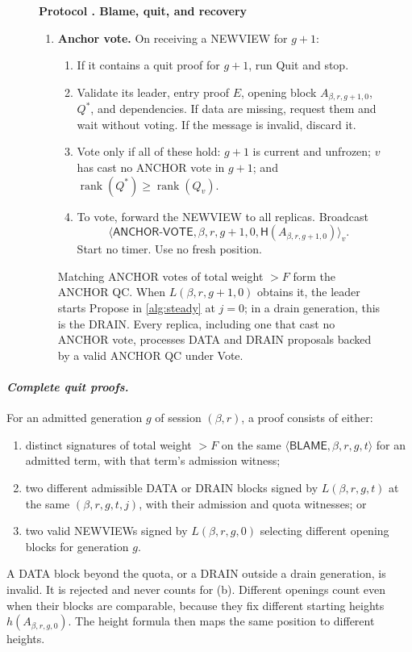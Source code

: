 \documentclass[11pt,a4paper]{article}
\newcommand{\RR}[1]{{\color{rrRed}#1}}
\newcommand{\Hash}{\mathsf H}
\newcommand{\rank}{\operatorname{rank}}
\newcommand{\tagg}[1]{\ensuremath{\mathsf{#1}}}
\newcommand{\defterm}[1]{\textcolor{rrBlue}{\textit{#1}}}
\newcounter{protocol}
\newenvironment{protocol}[3][htbp]{\begin{figure}[#1]\refstepcounter{protocol}\label{#2}
\begin{mdframed}[linewidth=.6pt,skipabove=0pt,skipbelow=0pt,
innertopmargin=7pt,innerbottommargin=7pt]\small
\textbf{Protocol \theprotocol. #3}\par\smallskip}{\end{mdframed}\end{figure}}
\begin{document}
\begin{protocol}{alg:recovery}{Blame, quit, and recovery}
\begin{enumerate}[label=\textbf{\arabic*)},itemsep=3pt]
\item \textbf{Anchor vote.} On receiving a NEWVIEW for $g+1$:
 \begin{enumerate}[label=(\alph*)]
 \item If it contains a quit proof for $g+1$, run Quit and stop.
 \item Validate its leader, entry proof $E$, opening block $A_{\beta,r,g+1,0}$,
       $Q^*$, and dependencies. If data are missing, request them and
       wait without voting. If the message is invalid, discard it.
 \item Vote only if all of these hold: $g+1$ is current and unfrozen; $v$
       has cast no ANCHOR vote in $g+1$; and $\rank(Q^*)\ge\rank(Q_v)$.
 \item To vote, forward the NEWVIEW to all replicas. Broadcast
       \[\langle\tagg{ANCHOR\mbox{-}VOTE},\beta,r,g+1,0,\Hash(A_{\beta,r,g+1,0})\rangle_v.\]
       Start no timer. Use no fresh position.
 \end{enumerate}
 Matching ANCHOR votes \RR{of total weight $>F$} form the ANCHOR QC.
 When $L(\beta,r,g+1,0)$ obtains it, the leader starts Propose in
 \cref{alg:steady} at $j=0$\RR{; in a drain generation, this is the
 DRAIN}. Every replica, including one that cast no ANCHOR vote,
 processes DATA \RR{and DRAIN} proposals backed by a valid ANCHOR QC
 under Vote.
\end{enumerate}
\end{protocol}

\paragraph{\defterm{Complete quit proofs.}}
For an admitted generation $g$ \RR{of session $(\beta,r)$}, a proof consists of
either:
\begin{enumerate}[label=(\alph*)]
\item distinct signatures \RR{of total weight $>F$} on the same
$\langle\tagg{BLAME},\beta,r,g,t\rangle$ for an admitted term, with that term's
admission witness;
\item two different admissible DATA \RR{or DRAIN} blocks signed by
$L(\beta,r,g,t)$ at the same $(\beta,r,g,t,j)$, with their admission \RR{and quota}
witnesses; or
\item two valid NEWVIEWs signed by $L(\beta,r,g,0)$ selecting different opening
blocks for generation $g$.
\end{enumerate}
\RR{A DATA block beyond the quota, or a DRAIN outside a drain generation,
is invalid. It is rejected and never counts for (b).}
Different openings count even when their blocks are comparable, because
they fix different starting heights $h(A_{\beta,r,g,0})$. The height formula then
maps the same position to different heights.
\end{document}
